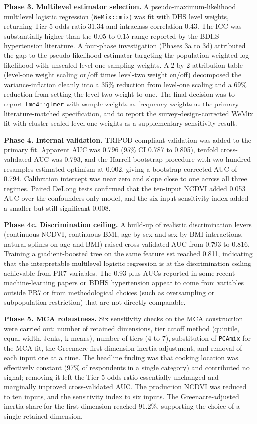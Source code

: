 \documentclass[
  12pt,
  a4paper]{article}
\begin{document}
\textbf{Phase 3. Multilevel estimator selection.} A pseudo-maximum-likelihood multilevel logistic regression (\texttt{WeMix::mix}) was fit with DHS level weights, returning Tier 5 odds ratio 31.34 and intraclass correlation 0.43. The ICC was substantially higher than the 0.05 to 0.15 range reported by the BDHS hypertension literature. A four-phase investigation (Phases 3a to 3d) attributed the gap to the pseudo-likelihood estimator targeting the population-weighted log-likelihood with unscaled level-one sampling weights. A 2 by 2 attribution table (level-one weight scaling on/off times level-two weight on/off) decomposed the variance-inflation cleanly into a 35\% reduction from level-one scaling and a 69\% reduction from setting the level-two weight to one. The final decision was to report \texttt{lme4::glmer} with sample weights as frequency weights as the primary literature-matched specification, and to report the survey-design-corrected WeMix fit with cluster-scaled level-one weights as a supplementary sensitivity result.

\textbf{Phase 4. Internal validation.} TRIPOD-compliant validation was added to the primary fit. Apparent AUC was 0.796 (95\% CI 0.787 to 0.805), tenfold cross-validated AUC was 0.793, and the Harrell bootstrap procedure with two hundred resamples estimated optimism at 0.002, giving a bootstrap-corrected AUC of 0.794. Calibration intercept was near zero and slope close to one across all three regimes. Paired DeLong tests confirmed that the ten-input NCDVI added 0.053 AUC over the confounders-only model, and the six-input sensitivity index added a smaller but still significant 0.008.

\textbf{Phase 4c. Discrimination ceiling.} A build-up of realistic discrimination levers (continuous NCDVI, continuous BMI, age-by-sex and sex-by-BMI interactions, natural splines on age and BMI) raised cross-validated AUC from 0.793 to 0.816. Training a gradient-boosted tree on the same feature set reached 0.811, indicating that the interpretable multilevel logistic regression is at the discrimination ceiling achievable from PR7 variables. The 0.93-plus AUCs reported in some recent machine-learning papers on BDHS hypertension appear to come from variables outside PR7 or from methodological choices (such as oversampling or subpopulation restriction) that are not directly comparable.

\textbf{Phase 5. MCA robustness.} Six sensitivity checks on the MCA construction were carried out: number of retained dimensions, tier cutoff method (quintile, equal-width, Jenks, k-means), number of tiers (4 to 7), substitution of \texttt{PCAmix} for the MCA fit, the Greenacre first-dimension inertia adjustment, and removal of each input one at a time. The headline finding was that cooking location was effectively constant (97\% of respondents in a single category) and contributed no signal; removing it left the Tier 5 odds ratio essentially unchanged and marginally improved cross-validated AUC. The production NCDVI was reduced to ten inputs, and the sensitivity index to six inputs. The Greenacre-adjusted inertia share for the first dimension reached 91.2\%, supporting the choice of a single retained dimension.
\end{document}
